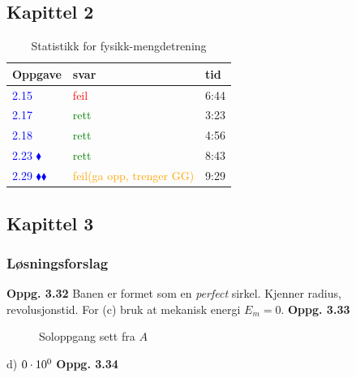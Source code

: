 \documentclass{article}
\numberwithin{equation}{section}
\begin{document}
\subsection{Kapittel 2}
\begin{table}[h]
  \centering
  \begin{tabular}{|l|l|l|}
  \hline
    \textbf{Oppgave} & \textbf{svar} & \textbf{tid} \\
  \hline
    \textcolor{blue}{2.15} & \textcolor{red}{feil} & 6:44 \\
    \textcolor{blue}{2.17} & \textcolor{green}{rett} & 3:23 \\
    \textcolor{blue}{2.18} & \textcolor{green}{rett} & 4:56 \\
    \textcolor{blue}{2.23 $\blacklozenge$} & \textcolor{green}{rett} & 8:43 \\
    \textcolor{blue}{2.29 $\blacklozenge\blacklozenge$} & \textcolor{orange}{feil(ga opp, trenger GG)} & 9:29 \\
  \hline
\end{tabular}
  \caption{Statistikk for fysikk-mengdetrening}
\end{table}
\subsection{Kapittel 3}
\subsubsection{Løsningsforslag}
\textbf{Oppg. 3.32} \newline
Banen er formet som en \textit{perfect} sirkel. Kjenner radius, revolusjonstid. 
For (c) bruk at mekanisk energi $E_m=0$. \newline
\textbf{Oppg. 3.33} \newline
\begin{figure}[h]
  \centering
  \caption{Soloppgang sett fra $A$}
\end{figure}
d) $\pgfmathprintnumber[sci, precision=8]{\pgfmathresult}$ \newline
\textbf{Oppg. 3.34} \newline
\end{document}
